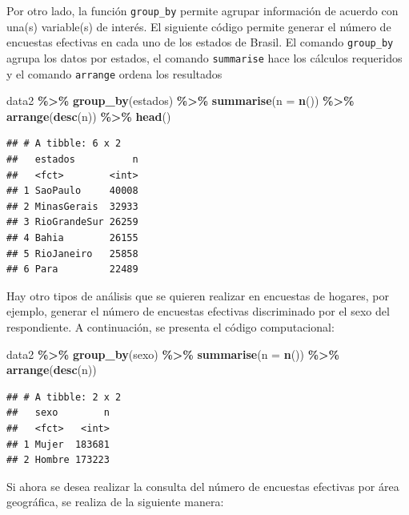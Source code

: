 \documentclass[
  12pt,
]{book}
\newenvironment{Shaded}{\begin{snugshade}}{\end{snugshade}}
\newcommand{\AttributeTok}[1]{\textcolor[rgb]{0.13,0.29,0.53}{#1}}
\newcommand{\FunctionTok}[1]{\textcolor[rgb]{0.13,0.29,0.53}{\textbf{#1}}}
\newcommand{\NormalTok}[1]{#1}
\newcommand{\SpecialCharTok}[1]{\textcolor[rgb]{0.81,0.36,0.00}{\textbf{#1}}}
\begin{document}
Por otro lado, la función \texttt{group\_by} permite agrupar información de acuerdo con una(s) variable(s) de interés. El siguiente código permite generar el número de encuestas efectivas en cada uno de los estados de Brasil. El comando \texttt{group\_by} agrupa los datos por estados, el comando \texttt{summarise} hace los cálculos requeridos y el comando \texttt{arrange} ordena los resultados

\begin{Shaded}
\begin{Highlighting}[]
\NormalTok{data2 }\SpecialCharTok{\%\textgreater{}\%} 
  \FunctionTok{group\_by}\NormalTok{(estados) }\SpecialCharTok{\%\textgreater{}\%} 
  \FunctionTok{summarise}\NormalTok{(}\AttributeTok{n =} \FunctionTok{n}\NormalTok{()) }\SpecialCharTok{\%\textgreater{}\%} \FunctionTok{arrange}\NormalTok{(}\FunctionTok{desc}\NormalTok{(n)) }\SpecialCharTok{\%\textgreater{}\%} \FunctionTok{head}\NormalTok{()}
\end{Highlighting}
\end{Shaded}

\begin{verbatim}
## # A tibble: 6 x 2
##   estados          n
##   <fct>        <int>
## 1 SaoPaulo     40008
## 2 MinasGerais  32933
## 3 RioGrandeSur 26259
## 4 Bahia        26155
## 5 RioJaneiro   25858
## 6 Para         22489
\end{verbatim}

Hay otro tipos de análisis que se quieren realizar en encuestas de hogares, por ejemplo, generar el número de encuestas efectivas discriminado por el sexo del respondiente. A continuación, se presenta el código computacional:

\begin{Shaded}
\begin{Highlighting}[]
\NormalTok{data2 }\SpecialCharTok{\%\textgreater{}\%} 
  \FunctionTok{group\_by}\NormalTok{(sexo) }\SpecialCharTok{\%\textgreater{}\%} 
  \FunctionTok{summarise}\NormalTok{(}\AttributeTok{n =} \FunctionTok{n}\NormalTok{()) }\SpecialCharTok{\%\textgreater{}\%} \FunctionTok{arrange}\NormalTok{(}\FunctionTok{desc}\NormalTok{(n)) }
\end{Highlighting}
\end{Shaded}

\begin{verbatim}
## # A tibble: 2 x 2
##   sexo        n
##   <fct>   <int>
## 1 Mujer  183681
## 2 Hombre 173223
\end{verbatim}

Si ahora se desea realizar la consulta del número de encuestas efectivas por área geográfica, se realiza de la siguiente manera:
\end{document}
